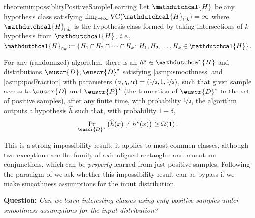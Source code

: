 \documentclass[11pt]{article}
\theoremstyle{plain}
\theoremstyle{definition}
\theoremstyle{remark}
\newcommand{\binparen}[1]{\big(#1\big)}
\newcommand{\inbrace}[1]{\left\{#1\right\}}
\newcommand{\nfrac}[2]{\nicefrac{#1}{#2}}
\newcommand{\vc}{\textrm{\rm VC}}
\newcommand{\wh}[1]{\widehat{#1}}
\newcommand{\customcal}[1]{\euscr{#1}}
\newcommand{\cD}{\customcal{D}}
\newcommand{\cP}{\customcal{P}}
\newcommand{\ie}{\textit{i.e.}}
\newcommand{\hypo}[1]{\mathdutchcal{#1}}
\newcommand{\hyH}{\hypo{H}}
\newcommand{\cDtrue}{\cD^\star}
\newcommand{\cPtrue}{\cP^\star}
\begin{document}
\begin{restatable}{theorem}{impossiblityPositiveSampleLearning}
    \label{thm:impossibilityPositiveSamples}
    Let $\hyH$ be any hypothesis class satisfying $\lim_{k\to\infty} \vc{}(\hyH_{\cap k})=\infty$ where $\hyH_{\cap k}$ is the hypothesis class formed by taking intersections of $k$ hypothesis from $\hyH$, \ie{}, 
    $\hyH_{\cap k}\coloneqq \inbrace{H_1\cap H_2\cap \dots\cap H_k\colon H_1,H_2,\dots,H_k\in \hyH}.$
    
    For any (randomized) algorithm, there is an $h^\star\in \hyH$ and distributions $\cD,\cDtrue$ satisfying \cref{asmp:smoothness} and \cref{asmp:posFraction} with parameters $(\sigma,q,\alpha)=(\nfrac{1}{2},1,\nfrac{1}{2})$, such that given sample access to $\cD$ and $\cPtrue$ (the truncation of $\cDtrue$ to the set of positive samples), after any finite time, with probability $\nfrac{1}{2}$, 
    the algorithm outputs a hypothesis $\wh{h}$ such that, with probability $1-\delta$,
    \[ 
        \Pr_{\cDtrue}\binparen{\wh{h}(x)\neq h^\star(x)}\geq \Omega(1)\,.
    \]
\end{restatable}
This is a strong impossibility result: it applies to most common classes, although two exceptions are the family of axis-aligned rectangles and monotone conjunctions, which can be \textit{properly} learned from just positive samples. Following the paradigm of \cite{haghtalab2020smooth, haghtalab2021smooth} we ask whether this impossibility result can be bypass if we make smoothness assumptions for the input distribution.

\begin{mdframed}
  \textbf{Question:} \textit{Can we learn interesting classes using only positive samples under smoothness assumptions for the input distribution?}
\end{mdframed}
\end{document}
